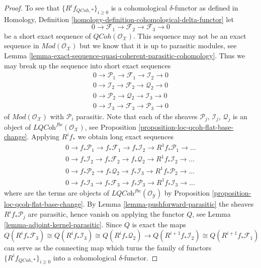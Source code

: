 \documentclass{stacks-project}
\theoremstyle{plain}
\theoremstyle{definition}
\theoremstyle{remark}
\numberwithin{equation}{subsection}
\def\QCoh{\mathit{QCoh}}
\begin{document}
\begin{proof}
\medskip\noindent
To see that $\{R^if_{\QCoh, *}\}_{i \geq 0}$ is a cohomological
$\delta$-functor as defined in
Homology, Definition \ref{homology-definition-cohomological-delta-functor}
let
$$
0 \to \mathcal{F}_1 \to \mathcal{F}_2 \to \mathcal{F}_3 \to 0
$$
be a short exact sequence of $\QCoh(\mathcal{O}_\mathcal{X})$.
This sequence may not be an exact sequence in
$\textit{Mod}(\mathcal{O}_\mathcal{X})$ but we know that it is
up to parasitic modules, see
Lemma \ref{lemma-exact-sequence-quasi-coherent-parasitic-cohomology}.
Thus we may break up the sequence into short exact sequences
$$
\begin{matrix}
0 \to \mathcal{P}_1 \to \mathcal{F}_1 \to \mathcal{I}_2 \to 0 \\
0 \to \mathcal{I}_2 \to \mathcal{F}_2 \to \mathcal{Q}_2 \to 0 \\
0 \to \mathcal{P}_2 \to \mathcal{Q}_2 \to \mathcal{I}_3 \to 0 \\
0 \to \mathcal{I}_3 \to \mathcal{F}_3 \to \mathcal{P}_3 \to 0
\end{matrix}
$$
of $\textit{Mod}(\mathcal{O}_\mathcal{X})$ with $\mathcal{P}_i$ parasitic.
Note that each of the sheaves
$\mathcal{P}_j$, $\mathcal{I}_j$, $\mathcal{Q}_j$ is an object of
$\textit{LQCoh}^{fbc}(\mathcal{O}_\mathcal{X})$, see
Proposition \ref{proposition-loc-qcoh-flat-base-change}.
Applying $R^if_*$ we obtain long exact sequences 
$$
\begin{matrix}
0 \to f_*\mathcal{P}_1 \to f_*\mathcal{F}_1 \to f_*\mathcal{I}_2 \to
R^1f_*\mathcal{P}_1 \to \ldots \\
0 \to f_*\mathcal{I}_2 \to f_*\mathcal{F}_2 \to f_*\mathcal{Q}_2 \to
R^1f_*\mathcal{I}_2 \to \ldots \\
0 \to f_*\mathcal{P}_2 \to f_*\mathcal{Q}_2 \to f_*\mathcal{I}_3 \to
R^1f_*\mathcal{P}_2 \to \ldots \\
0 \to f_*\mathcal{I}_3 \to f_*\mathcal{F}_3 \to f_*\mathcal{P}_3 \to
R^1f_*\mathcal{I}_3 \to \ldots
\end{matrix}
$$
where are the terms are objects of
$\textit{LQCoh}^{fbc}(\mathcal{O}_\mathcal{Y})$ by
Proposition \ref{proposition-loc-qcoh-flat-base-change}.
By
Lemma \ref{lemma-pushforward-parasitic}
the sheaves $R^if_*\mathcal{P}_j$ are parasitic, hence vanish on applying
the functor $Q$, see
Lemma \ref{lemma-adjoint-kernel-parasitic}.
Since $Q$ is exact the maps
$$
Q(R^if_*\mathcal{F}_3)
\cong
Q(R^if_*\mathcal{I}_3)
\cong
Q(R^if_*\mathcal{Q}_2)
\rightarrow
Q(R^{i + 1}f_*\mathcal{I}_2)
\cong
Q(R^{i + 1}f_*\mathcal{F}_1)
$$
can serve as the connecting map which turns the family of functors
$\{R^if_{\QCoh, *}\}_{i \geq 0}$
into a cohomological $\delta$-functor.
\end{proof}
\end{document}
